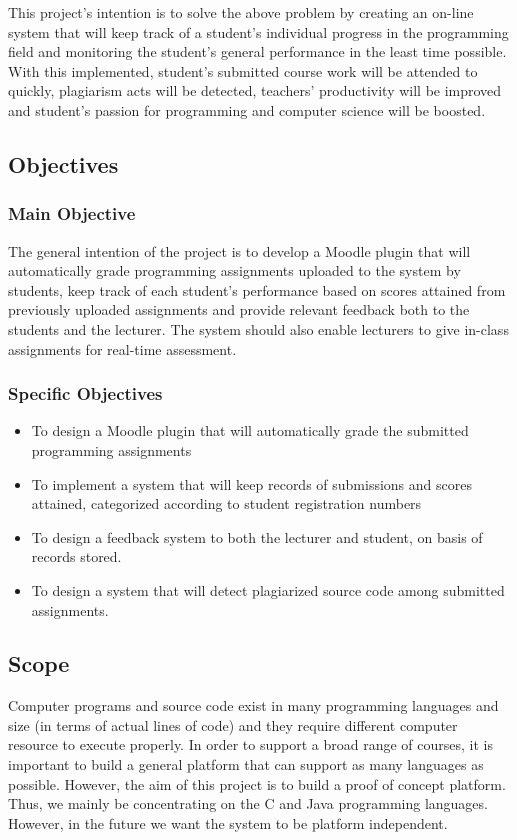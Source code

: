 \documentclass[12pt]{article}
\begin{document}
		This project's intention is to solve the above problem by creating an on-line system that will keep track of a student's individual progress in the programming field and monitoring the student's general performance in the least time possible. With this implemented, student's submitted course work will be attended to quickly, plagiarism acts will be detected, teachers' productivity will be improved and student's passion for programming and computer science will be boosted.
	\subsection{Objectives}
		\subsubsection{Main Objective}
		The general intention of the project is to develop a Moodle plugin that will automatically grade programming assignments uploaded to the system by students, keep track of each student’s performance based on scores attained from previously uploaded assignments and provide relevant feedback both to the students and the lecturer. The system should also enable lecturers to give in-class assignments for real-time assessment.
		\subsubsection{Specific Objectives}
		\begin{itemize}
			\item To design a Moodle plugin that will automatically grade the submitted programming assignments 
			\item To implement a system that will keep records of submissions and scores attained, categorized according to 	student registration numbers
			\item To design a feedback system to both the lecturer and student, on basis of records stored.
			\item To design a system that will detect plagiarized source code among submitted assignments.
		\end{itemize}
		
	\subsection{Scope}
		Computer programs and source code exist in many programming languages and size (in terms of actual lines of code) and they require different computer resource to execute properly. In order to support a broad range of courses, it is important to build a general platform that can support as many languages as possible. However, the aim of this project is to build a proof of concept platform. Thus, we mainly be concentrating on the C and Java programming languages.
		However, in the future we want the system to be platform independent. \\
		 
\end{document}
